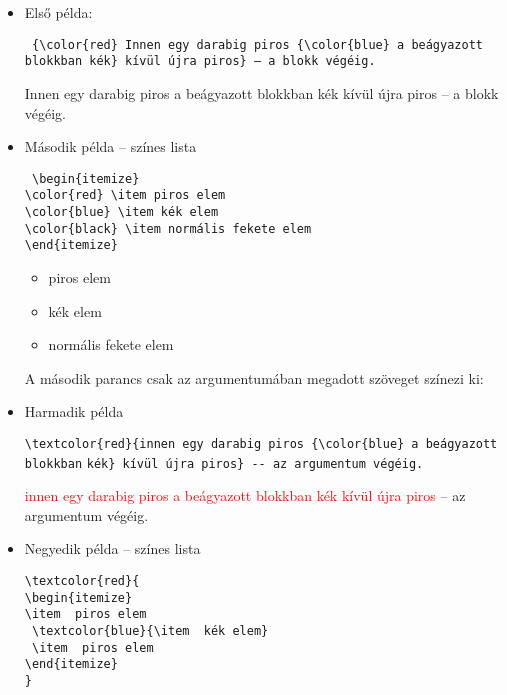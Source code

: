 \documentclass{article}
\begin{document}
\begin{itemize}
\item Első példa:

\texttt{ \{\textbackslash color\{red\} Innen egy darabig piros \{\textbackslash color\{blue\} a beágyazott blokkban kék\} kívül újra piros\} -- a blokk végéig.}

{\color{red} Innen egy darabig piros {\color{blue} a beágyazott blokkban kék} kívül újra piros} -- a blokk végéig.

\item Második példa -- színes lista

\texttt{%
\textbackslash begin\{itemize\}\\
    \textbackslash color\{red\} \textbackslash item  piros elem \\   
   \textbackslash color\{blue\}  \textbackslash item  kék elem \\  
    \textbackslash color\{black\} \textbackslash item  normális fekete elem \\   
\textbackslash end\{itemize\}
}

\begin{itemize}
\color{red} \item  piros elem
\color{blue}  \item  kék elem
\color{black} \item  normális fekete elem
\end{itemize}

A második parancs csak az argumentumában megadott szöveget színezi ki:

\vspace*{2ex}
\vspace*{2ex}

\item Harmadik példa

\verb!\textcolor{red}{innen egy darabig piros {\color{blue} a beágyazott blokkban! \verb!kék} kívül újra piros} -- az argumentum végéig.!

\textcolor{red}{ innen egy darabig piros {\color{blue} a beágyazott blokkban kék} kívül újra piros} -- az argumentum végéig.

\item Negyedik példa -- színes lista

\begin{verbatim} 
\textcolor{red}{
\begin{itemize}
\item  piros elem
 \textcolor{blue}{\item  kék elem}
 \item  piros elem
\end{itemize}
}
\end{verbatim}
\textcolor{red}{
}

\end{itemize}
\end{document}
